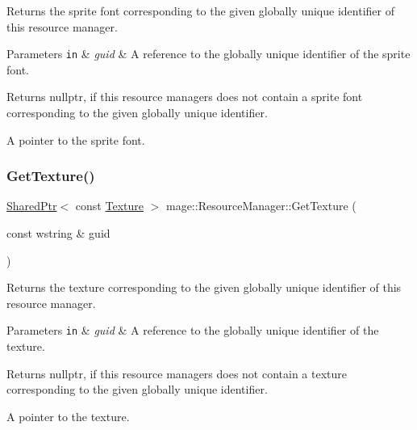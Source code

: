 Returns the sprite font corresponding to the given globally unique identifier of this resource manager.


\begin{DoxyParams}[1]{Parameters}
\mbox{\tt in}  & {\em guid} & A reference to the globally unique identifier of the sprite font. \\
\hline
\end{DoxyParams}
\begin{DoxyReturn}{Returns}
{\ttfamily nullptr}, if this resource managers does not contain a sprite font corresponding to the given globally unique identifier. 

A pointer to the sprite font. 
\end{DoxyReturn}
\hypertarget{classmage_1_1_resource_manager_a2e2f86c3ab9c91900e8f10b94cafb06a}{}\label{classmage_1_1_resource_manager_a2e2f86c3ab9c91900e8f10b94cafb06a} 
\subsubsection{\texorpdfstring{Get\+Texture()}{GetTexture()}}
{\footnotesize\ttfamily \hyperlink{namespacemage_a1e01ae66713838a7a67d30e44c67703e}{Shared\+Ptr}$<$ const \hyperlink{classmage_1_1_texture}{Texture} $>$ mage\+::\+Resource\+Manager\+::\+Get\+Texture (\begin{DoxyParamCaption}\item[{const wstring \&}]{guid }\end{DoxyParamCaption})\hspace{0.3cm}{\ttfamily [noexcept]}}

Returns the texture corresponding to the given globally unique identifier of this resource manager.


\begin{DoxyParams}[1]{Parameters}
\mbox{\tt in}  & {\em guid} & A reference to the globally unique identifier of the texture. \\
\hline
\end{DoxyParams}
\begin{DoxyReturn}{Returns}
{\ttfamily nullptr}, if this resource managers does not contain a texture corresponding to the given globally unique identifier. 

A pointer to the texture. 
\end{DoxyReturn}
\hypertarget{classmage_1_1_resource_manager_ac54eb6fd61322a66bdc704a88eca192d}{}\label{classmage_1_1_resource_manager_ac54eb6fd61322a66bdc704a88eca192d} 
